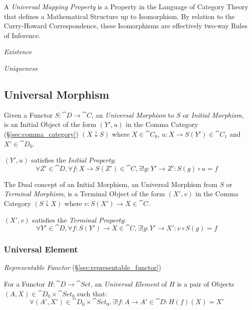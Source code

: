 A \emph{Universal Mapping Property} is a Property in the Language of
Category Theory that defines a Mathematical Structure up to
Isomorphism. By relation to the Curry-Howard Correspondence, these
Isomorphisms are effectively two-way Rules of Inference.

\emph{Existence}

\emph{Uniqueness}



\subsection{Universal Morphism}\label{sec:universal_morphism}

Given a Functor $S: \cat{D} \rightarrow \cat{C}$, an
\emph{Universal Morphism} to $S$ or \emph{Initial Morphism}, is an
Initial Object of the form $(Y',u)$ in the Comma Category
(\S\ref{sec:comma_category}) $(X \downarrow S)$ where $X \in
\cat{C}_0$, $u : X \rightarrow S(Y') \in \cat{C}_1$ and $X' \in
\cat{D}_0$.

$(Y', u)$ satisfies the \emph{Initial Property}:
\[
  \forall Z' \in \cat{D}, \forall f : X \rightarrow S(Z') \in
  \cat{C}, \exists! g : Y' \rightarrow Z' : S(g) \circ u = f
\]

The Dual concept of an Initial Morphism, an Universal Morphism from
$S$ or \emph{Terminal Morphism}, is a Terminal Object of the form
$(X',v)$ in the Comma Category $(S \downarrow X)$ where $v : S(X')
\rightarrow X \in \cat{C}$.

$(X',v)$ satisfies the \emph{Terminal Property}:
\[
  \forall Y' \in \cat{D}, \forall f : S(Y') \rightarrow X \in
  \cat{C}, \exists! g : Y' \rightarrow X' : v \circ S(g) = f
\]




\subsubsection{Universal Element}\label{sec:universal_element}

\emph{Representable Functor} (\S\ref{sec:representable_functor})

For a Functor $H : \cat{D} \rightarrow \cat{Set}$, an
\emph{Universal Element} of $H$ is a pair of Objects $(A,X) \in
\cat{D}_0 \times \cat{Set}_0$ such that:
\[
  \forall (A',X') \in \cat{D}_0 \times \cat{Set}_0,
  \exists! f : A \rightarrow A' \in \cat{D} : H(f)(X) = X'
\]



